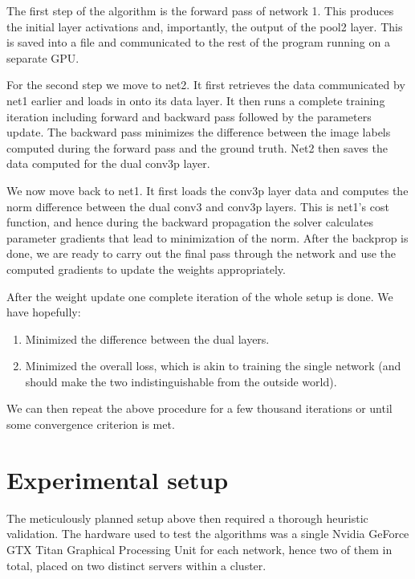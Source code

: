 \documentclass[a4paper, 12pt]{article}
\numberwithin{equation}{section}
\begin{document}
	The first step of the algorithm is the forward pass of network 1. This produces the initial layer activations and, importantly, the output of the pool2 layer. This is saved into a file and communicated to the rest of the program running on a separate GPU.
	
	For the second step we move to net2. It first retrieves the data communicated by net1 earlier and loads in onto its data layer. It then runs a complete training iteration including forward and backward pass followed by the parameters update. The backward pass minimizes the difference between the image labels computed during the forward pass and the ground truth. Net2 then saves the data computed for the dual conv3p layer.
	
	We now move back to net1. It first loads the conv3p layer data and computes the norm difference between the dual conv3 and conv3p layers. This is net1's cost function, and hence during the backward propagation the solver calculates parameter gradients that lead to minimization of the norm. After the backprop is done, we are ready to carry out the final pass through the network and use the computed gradients to update the weights appropriately.
	
	After the weight update one complete iteration of the whole setup is done. We have hopefully:
	
	\begin{enumerate}
		\item Minimized the difference between the dual layers.
		\item Minimized the overall loss, which is akin to training the single network (and should make the two indistinguishable from the outside world).
	\end{enumerate}
	
	We can then repeat the above procedure for a few thousand iterations or until some convergence criterion is met.
	
	\section{Experimental setup}
	
	The meticulously planned setup above then required a thorough heuristic validation. The hardware used to test the algorithms was a single Nvidia GeForce GTX Titan Graphical Processing Unit for each network, hence two of them in total, placed on two distinct servers within a cluster.
	
\end{document}
